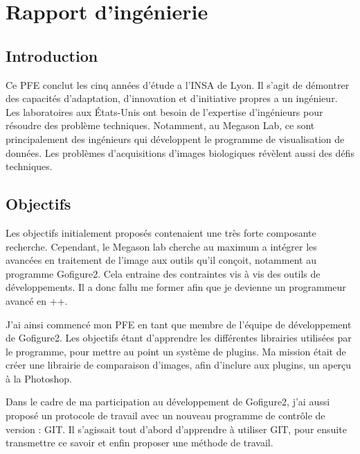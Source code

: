 

\chapter{Rapport d'ingénierie} 








\section*{Introduction}

Ce PFE conclut les cinq années d'étude a l'INSA de Lyon. 
Il s'agit de démontrer des capacités d'adaptation, d'innovation et d'initiative propres a un ingénieur. Les laboratoires aux 
États-Unis ont besoin de l'expertise d'ingénieurs pour résoudre des problème techniques. 
Notamment, au Megason Lab, ce sont principalement des ingénieurs qui développent le programme de visualisation de données. 
Les problèmes d'acquisitions d'images biologiques révèlent aussi des défis techniques.
 
\section*{Objectifs}

Les objectifs initialement proposés contenaient une très forte composante recherche.
Cependant, le Megason lab cherche au maximum a intégrer les avancées en traitement de l'image aux outils qu'il conçoit,
 notamment au programme Gofigure2. Cela entraine des contraintes vis à vis des outils de développements. 
 Il a donc fallu me former afin que je devienne un programmeur avancé en {\C++}. 
 
J'ai ainsi commencé mon PFE en tant que membre de l'équipe de développement de Gofigure2.
 Les objectifs étant d'apprendre les différentes librairies utilisées par le programme, pour mettre au point un système de plugins. 
 Ma mission était de créer une librairie de comparaison d'images, afin d'inclure aux plugins, un aperçu à la Photoshop.

Dans le cadre de ma participation au développement de Gofigure2,
 j'ai aussi proposé un protocole de travail avec un nouveau programme de contrôle de version : GIT.
 Il s'agissait tout d'abord d'apprendre à utiliser GIT, pour ensuite transmettre ce savoir et enfin proposer une méthode de travail.

